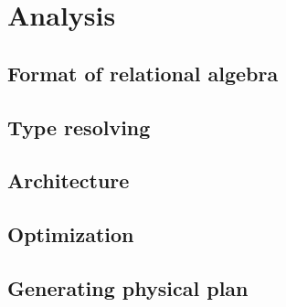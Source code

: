 \chapter{Analysis}

\section{Format of relational algebra}


\section{Type resolving}


\section{Architecture}



\section{Optimization}


\section{Generating physical plan}